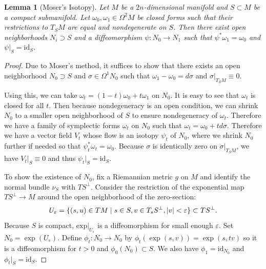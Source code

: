 \documentclass[leqno, openany]{memoir}
\DeclarePairedDelimiter{\abs}{\lvert}{\rvert}
\newtheorem{lem}[thm]{Lemma}
\theoremstyle{definition}
\theoremstyle{remark}
\theoremstyle{plain}
\theoremstyle{definition}
\theoremstyle{remark}
\newcommand{\ep}{\varepsilon}
\newcommand{\mr}[1]{\mathrm{#1}}
\begin{document}
\begin{lem}[Moser's Isotopy]
    Let $M$ be a $2n$-dimensional manifold and $S \subset M$ be a compact submanifold. Let $\omega_0, \omega_1 \in \Omega^2 M$ be closed forms such that their restrictions to $T_S M$ are equal and nondegenerate on $S$. Then there exist open neighborhoods $N_i \supset S$ and a diffeomorphism $\psi: N_0 \to N_1$ such that $\psi^* \omega_1 = \omega_0$ and $\psi |_S = \mr{id}_S$.
\end{lem}
\begin{proof}
    Due to Moser's method, it suffices to show that there exists an open neighborhood $N_0 \supset S$ and $\sigma \in \Omega^1 N_0$ such that $\omega_1 - \omega_0 = d \sigma$ and $\sigma |_{T_SM} \equiv 0$.

    Using this, we can take $\omega_t = (1 - t) \omega_0 + t \omega_1$ on $N_0$. It is easy to see that $\omega_t$ is closed for all $t$. Then because nondegeneracy is an open condition, we can shrink $N_0$ to a smaller open neighborhood of $S$ to ensure nondegeneracy of $\omega_t$. Therefore we have a family of symplectic forms $\omega_t$ on $N_0$ such that $\omega_t = \omega_0 + t d \sigma$. Therefore we have a vector field $V_t$ whose flow is an isotopy $\psi_t$ of $N_0$, where we shrink $N_0$ further if needed so that $\psi_t^* \omega_t = \omega_0$. Because $\sigma$ is identically zero on $\sigma |_{T_SM}$, we have $V_t |_S \equiv 0$ and thus $\psi_t|_S = \mr{id}_S$.

    To show the existence of $N_0$, fix a Riemannian metric $g$ on $M$ and identify the normal bundle $\nu_S$ with $TS^{\perp}$. Consider the restriction of the exponential map $TS^{\perp} \to M$ around the open neighborhood of the zero-section:
    \[ U_{\ep} = \{ (s,u) \in TM \mid s \in S, v \in T_s S^{\perp}, \abs{v} < \ep \} \subset TS^{\perp}. \]
    Because $S$ is compact, $\mr{exp} |_{U_{\ep}}$ is a diffeomorphism for small enough $\ep$. Set $N_0 = \exp(U_{\ep})$. Define $\phi_t:N_0 \to N_0$ by $\phi_t(\exp(s,v)) = \exp(s, tv)$ so it is a diffeomorphism for $t > 0$ and $\phi_0(N_0) \subset S$. We also have $\phi_1 = \mr{id}_{N_0}$ and $\phi_t |_S = \mr{id}_S$.


\end{proof}
\end{document}
